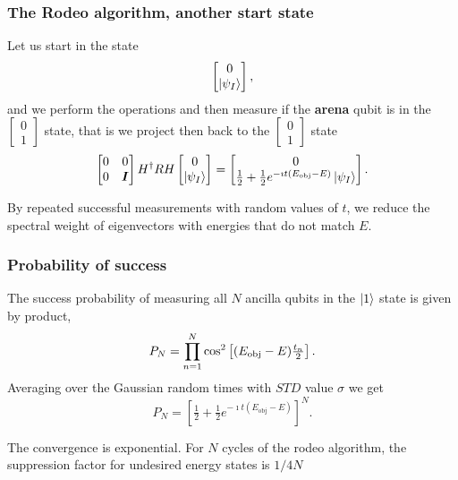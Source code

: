 \documentclass{beamer}
\begin{document}
\begin{frame}
\frametitle{The Rodeo algorithm, another start state}
Let us start in the state
\[
\begin{bmatrix} 0 \\ \ket{\psi_I}\end{bmatrix},
\]
and we perform the operations and then measure if the {\bf arena} qubit is in the $\begin{bmatrix} 0 \\ 1\end{bmatrix}$ state, that is  
we project then back to the $\begin{bmatrix} 0 \\ 1\end{bmatrix}$ state 
\[
\begin{bmatrix} 0 & 0 \\ 0 & \bm{I}\end{bmatrix}H^{\dagger}RH\begin{bmatrix} 0 \\ \ket{\psi_I}\end{bmatrix} =\begin{bmatrix} 0\\ \tfrac{1}{2}+\tfrac{1}{2}e^{-\imath t(E_{\mathrm{obj}}-E)}\ket{\psi_I}\end{bmatrix}.
\]

By repeated successful measurements with random values of $t$, we reduce
the spectral weight of eigenvectors with energies that do not match $E$.


\end{frame}



\begin{frame}
\frametitle{Probability of success}


The success probability of measuring all $N$ ancilla qubits in the $\ket{1}$ state is given by product, 
\[
   P_N =\prod_{n=1}^N \cos^2\left[(E_{\rm obj}
   -E)\tfrac{t_n}{2}\right].
\]
Averaging over the Gaussian random times with $STD$ value $\sigma$ we get
\[
   P_N =\left[\tfrac{1}{2}+\tfrac{1}{2}e^{-\imath t(E_{\mathrm{obj}}-E)}\right]^{N}.
\]

The convergence is exponential. For $N$ cycles of the rodeo algorithm, the
suppression factor for undesired energy states is $1/4N$

\end{frame}
\end{document}
